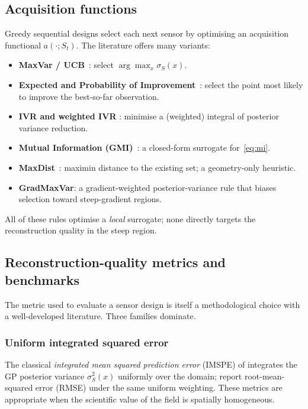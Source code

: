 \documentclass[11pt,letterpaper]{article}
\begin{document}
\subsection{Acquisition functions}
Greedy sequential designs select each next sensor by optimising an
acquisition functional $a(\cdot;S_{t})$. The literature offers many
variants:
\begin{itemize}[itemsep=2pt,topsep=2pt]
  \item \textbf{MaxVar / UCB}~\citep{srinivas2010gaussian}: select
        $\arg\max_{x}\sigma_{S}(x)$.
  \item \textbf{Expected and Probability of
        Improvement}~\citep{mockus1978application,jones1998efficient}:
        select the point most likely to improve the best-so-far
        observation.
  \item \textbf{IVR and weighted IVR}
        \citep{sacks1989design,gramacy2009adaptive}: minimise a
        (weighted) integral of posterior variance reduction.
  \item \textbf{Mutual Information (GMI)}~\citep{krause2008near}: a
        closed-form surrogate for~\eqref{eq:mi}.
  \item \textbf{MaxDist}~\citep{johnson1990minimax}: maximin distance
        to the existing set; a geometry-only heuristic.
  \item \textbf{GradMaxVar}: a gradient-weighted posterior-variance
        rule that biases selection toward steep-gradient regions.
\end{itemize}
All of these rules optimise a \emph{local} surrogate; none directly
targets the reconstruction quality in the steep region.

\subsection{Reconstruction-quality metrics and benchmarks}
\label{sec:metrics-litreview}
The metric used to evaluate a sensor design is itself a methodological
choice with a well-developed literature. Three families dominate.

\subsubsection{Uniform integrated squared error}
The classical \emph{integrated mean squared prediction error} (IMSPE)
of \citet{sacks1989design} integrates the GP posterior variance
$\sigma_{S}^{2}(x)$ uniformly over the domain;
\citet{krause2008near} report root-mean-squared error (RMSE) under the
same uniform weighting. These metrics are appropriate when the
scientific value of the field is spatially homogeneous.
\end{document}
